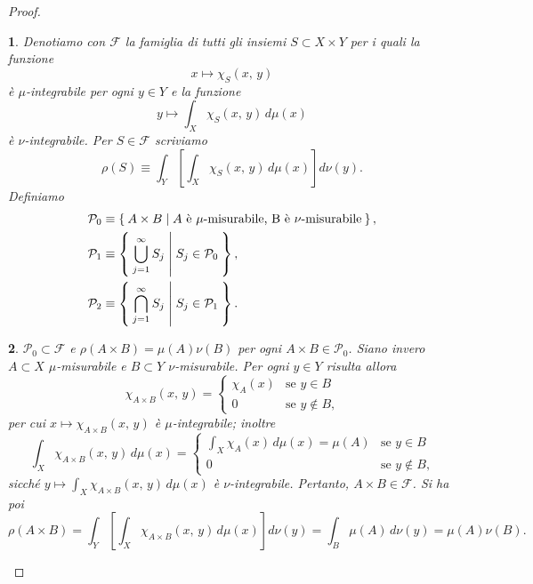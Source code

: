 \documentclass[a4paper,10pt,openright,oneside]{book}
\theoremstyle{theoremstyle}
\theoremstyle{theoremstylewoheader}
\theoremstyle{theoremstyle}
\theoremstyle{proofsecstyle}
\newtheorem{proofsec}{}
\theoremstyle{nonumberplain}
\newtheorem{proof}{Dim.}
\newcommand{\FF}{\ensuremath{\mathcal{F}}}
\newcommand{\PP}{\ensuremath{\mathcal{P}}}
\begin{document}
\begin{proof}
\begin{proofsec}
Denotiamo con $\FF$ la famiglia di tutti gli insiemi $S \subset X \times Y$ per i quali la funzione
\[
x \mapsto \chi_S(x,\, y)
\]
è $\mu$-integrabile per ogni $y \in Y$ e la funzione
\[
y \mapsto \int_X \chi_S(x,\, y)\, d\mu(x)
\]
è $\nu$-integrabile. Per $S \in \FF$ scriviamo
\[
\rho(S) \equiv \int_Y \left[\int_X \chi_S(x,\, y)\, d\mu(x)\right] d\nu(y).
\]
Definiamo
\begin{align*}
\PP_0 &\equiv \Set{ A \times B | \text{$A$ è $\mu$-misurabile, B è $\nu$-misurabile} },\\
\PP_1 &\equiv \Set{ \bigcup_{j=1}^\infty S_j | S_j \in \PP_0 },\\
\PP_2 &\equiv \Set{ \bigcap_{j=1}^\infty S_j | S_j \in \PP_1 }.
\end{align*}
\end{proofsec}

\begin{proofsec}
\emph{$\PP_0 \subset \FF$ e $\rho(A \times B) = \mu(A) \nu(B)$ per ogni $A \times B \in \PP_0$.}\hspace{.5em} Siano invero $A \subset X$ $\mu$-misurabile e $B \subset Y$ $\nu$-misurabile. Per ogni $y \in Y$ risulta allora
\[
\chi_{A \times B} (x,\, y) =
\begin{cases}
\chi_A(x) & \text{se $y \in B$}\\
0 & \text{se $y \notin B$,}
\end{cases}
\]
per cui $x \mapsto \chi_{A \times B}(x,\, y)$ è $\mu$-integrabile; inoltre 
\[
\int_X \chi_{A \times B} (x,\, y)\, d\mu(x) =
\begin{cases}
\int_X \chi_A(x)\, d\mu(x) = \mu(A) & \text{se $y \in B$}\\
0 & \text{se $y \notin B$,}
\end{cases}
\]
sicché $y \mapsto \int_X \chi_{A \times B} (x,\, y)\, d\mu(x)$ è $\nu$-integrabile. Pertanto, $A \times B \in \FF$. Si ha poi
\[
\rho(A \times B) = \int_Y \left[\int_X \chi_{A \times B}(x,\, y)\, d\mu(x)\right] d\nu(y) = \int_B \mu(A)\, d\nu(y) = \mu(A) \nu(B).
\]
\end{proofsec}


\end{proof}
\end{document}
